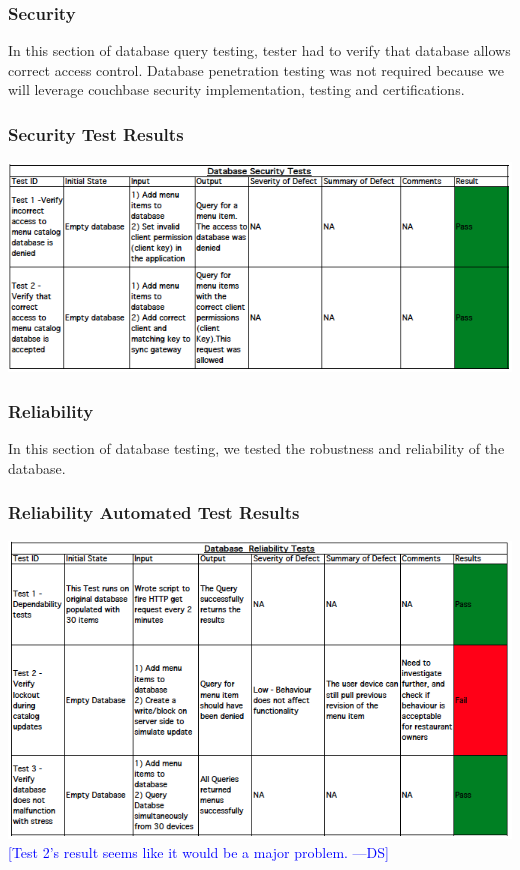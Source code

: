 \documentclass[12pt, titlepage]{article}
\newcommand{\authornote}[3]{\textcolor{#1}{[#3 ---#2]}}
\newcommand{\authornote}[3]{}
\newcommand{\ds}[1]{\authornote{blue}{DS}{#1}}
\begin{document}
\subsubsection{Security}
In this section of database query testing, tester had to verify that database allows correct access control. Database penetration testing was not required because we will leverage couchbase security implementation, testing and certifications.
\subsubsection{Security Test Results}
\includegraphics[width=\textwidth,height=\textheight,keepaspectratio]{security_tests.png}

\subsubsection{Reliability}
In this section of database testing, we tested the robustness and reliability of the database. 
\subsubsection{Reliability Automated Test Results }
\includegraphics[width=\textwidth,height=\textheight,keepaspectratio]{reliability_tests.png}
\ds{Test 2's result seems like it would be a major problem.}
\end{document}
